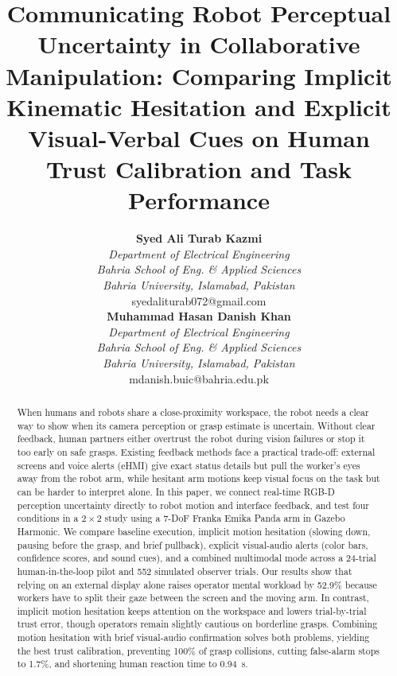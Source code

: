 \documentclass[conference]{IEEEtran}
\DeclareRobustCommand{\IEEEauthorblockN}[1]{{\normalsize\bfseries #1}\par\vskip 2pt}
\DeclareRobustCommand{\IEEEauthorblockA}[1]{{\small #1}\par}
\begin{document}
\title{Communicating Robot Perceptual Uncertainty in Collaborative Manipulation: Comparing Implicit Kinematic Hesitation and Explicit Visual-Verbal Cues on Human Trust Calibration and Task Performance}

\author{
\parbox{0.46\textwidth}{\centering
    \IEEEauthorblockN{Syed Ali Turab Kazmi}
    \IEEEauthorblockA{\textit{Department of Electrical Engineering} \\
    \textit{Bahria School of Eng. \& Applied Sciences} \\
    \textit{Bahria University, Islamabad, Pakistan} \\
    syedaliturab072@gmail.com}
}
\hfill
\parbox{0.46\textwidth}{\centering
    \IEEEauthorblockN{Muhammad Hasan Danish Khan}
    \IEEEauthorblockA{\textit{Department of Electrical Engineering} \\
    \textit{Bahria School of Eng. \& Applied Sciences} \\
    \textit{Bahria University, Islamabad, Pakistan} \\
    mdanish.buic@bahria.edu.pk}
}
}

\maketitle
\thispagestyle{empty}

\begin{abstract}
When humans and robots share a close-proximity workspace, the robot needs a clear way to show when its camera perception or grasp estimate is uncertain. Without clear feedback, human partners either overtrust the robot during vision failures or stop it too early on safe grasps. Existing feedback methods face a practical trade-off: external screens and voice alerts (eHMI) give exact status details but pull the worker's eyes away from the robot arm, while hesitant arm motions keep visual focus on the task but can be harder to interpret alone. In this paper, we connect real-time RGB-D perception uncertainty directly to robot motion and interface feedback, and test four conditions in a $2 \times 2$ study using a 7-DoF Franka Emika Panda arm in Gazebo Harmonic. We compare baseline execution, implicit motion hesitation (slowing down, pausing before the grasp, and brief pullback), explicit visual-audio alerts (color bars, confidence scores, and sound cues), and a combined multimodal mode across a 24-trial human-in-the-loop pilot and 552 simulated observer trials. Our results show that relying on an external display alone raises operator mental workload by 52.9\% because workers have to split their gaze between the screen and the moving arm. In contrast, implicit motion hesitation keeps attention on the workspace and lowers trial-by-trial trust error, though operators remain slightly cautious on borderline grasps. Combining motion hesitation with brief visual-audio confirmation solves both problems, yielding the best trust calibration, preventing 100\% of grasp collisions, cutting false-alarm stops to 1.7\%, and shortening human reaction time to 0.94~s.
\end{abstract}
\end{document}
